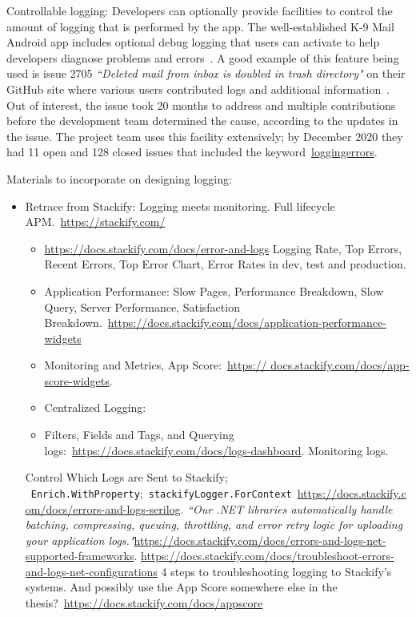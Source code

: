 Controllable logging: Developers can optionally provide facilities to control the amount of logging that is performed by the app. The well-established K-9 Mail Android app includes optional debug logging that users can activate to help developers diagnose problems and errors~\citep{github2020_k9mail_logging_errors}. A good example of this feature being used is issue 2705 \emph{``Deleted mail from inbox is doubled in trash directory"} on their GitHub site where various users contributed logs and additional information~\citep{github2017_k9mail_issue_2705}. Out of interest, the issue took 20 months to address and multiple contributions before the development team determined the cause, according to the updates in the issue. The project team uses this facility extensively; by  December 2020 they had 11 open and 128 closed issues that included the keyword~\href{https://github.com/k9mail/k-9/issues?utf8=\%E2\%9C\%93\&q=is\%3Aissue\%20is\%3Aopen\%20loggingerrors\%20}{loggingerrors}.

Materials to incorporate on designing logging:
\begin{itemize}
    \item Retrace from Stackify: Logging meets monitoring. Full lifecycle APM.~\url{https://stackify.com/}
    \begin{itemize}
        \item \url{https://docs.stackify.com/docs/error-and-logs} Logging Rate, Top Errors, Recent Errors, Top Error Chart, Error Rates in dev, test and production.
        \item Application Performance: Slow Pages, Performance Breakdown, Slow Query, Server Performance, Satisfaction Breakdown.~\url{https://docs.stackify.com/docs/application-performance-widgets}
        \item Monitoring and Metrics, App Score:~\href{https://docs.stackify.com/docs/app-score-widgets}{https:// docs.stackify.com/docs/app-score-widgets}.
        \item Centralized Logging: 
        \item Filters, Fields and Tags, and Querying logs:~\url{https://docs.stackify.com/docs/logs-dashboard}. Monitoring logs. 
    \end{itemize}Control Which Logs are Sent to Stackify; ~\texttt{Enrich.WithProperty};~\texttt{stackifyLogger.ForContext}~\url{https://docs.stackify.com/docs/errors-and-logs-serilog}. \emph{``Our .NET libraries automatically handle batching, compressing, queuing, throttling, and error retry logic for uploading your application logs."}\url{https://docs.stackify.com/docs/errors-and-logs-net-supported-frameworks}. \url{https://docs.stackify.com/docs/troubleshoot-errors-and-logs-net-configurations} 4 steps to troubleshooting logging to Stackify's systems. And possibly use the App Score somewhere else in the thesis?~\url{https://docs.stackify.com/docs/appscore}
\end{itemize}

